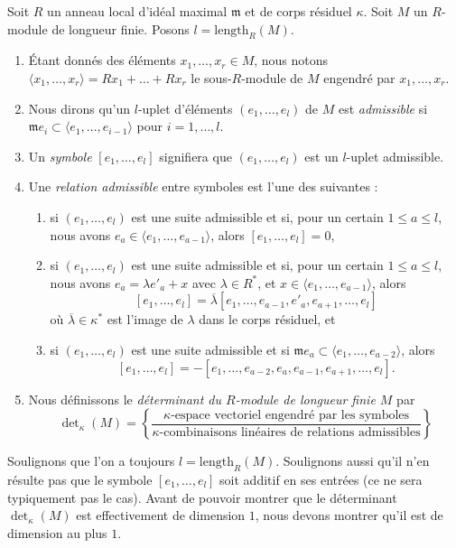 \begin{definition}
\label{definition-determinant}
Soit $R$ un anneau local d'idéal maximal $\mathfrak m$ et de
corps résiduel $\kappa$. Soit $M$ un $R$-module de longueur finie.
Posons $l = \text{length}_R(M)$.
\begin{enumerate}
\item Étant donnés des éléments $x_1, \ldots, x_r \in M$, nous notons
$\langle x_1, \ldots, x_r \rangle = Rx_1 + \ldots + Rx_r$ le
sous-$R$-module de $M$ engendré par $x_1, \ldots, x_r$.
\item Nous dirons qu'un $l$-uplet d'éléments
$(e_1, \ldots, e_l)$ de $M$ est {\it admissible} si
$\mathfrak m e_i \subset \langle e_1, \ldots, e_{i - 1} \rangle$
pour $i = 1, \ldots, l$.
\item Un {\it symbole} $[e_1, \ldots, e_l]$ signifiera que
$(e_1, \ldots, e_l)$ est un $l$-uplet admissible.
\item Une {\it relation admissible} entre symboles est l'une des suivantes :
\begin{enumerate}
\item si $(e_1, \ldots, e_l)$ est une suite admissible et si,
pour un certain $1 \leq a \leq l$, nous avons
$e_a \in \langle e_1, \ldots, e_{a - 1}\rangle$, alors
$[e_1, \ldots, e_l] = 0$,
\item si $(e_1, \ldots, e_l)$ est une suite admissible et si,
pour un certain $1 \leq a \leq l$, nous avons $e_a = \lambda e'_a + x$
avec $\lambda \in R^*$, et
$x \in \langle e_1, \ldots, e_{a - 1}\rangle$, alors
$$
[e_1, \ldots, e_l] =
\overline{\lambda} [e_1, \ldots, e_{a - 1}, e'_a, e_{a + 1}, \ldots, e_l]
$$
où $\overline{\lambda} \in \kappa^*$ est l'image de $\lambda$ dans
le corps résiduel, et
\item si $(e_1, \ldots, e_l)$ est une suite admissible et si
$\mathfrak m e_a \subset \langle e_1, \ldots, e_{a - 2}\rangle$, alors
$$
[e_1, \ldots, e_l] =
- [e_1, \ldots, e_{a - 2}, e_a, e_{a - 1}, e_{a + 1}, \ldots, e_l].
$$
\end{enumerate}
\item
Nous définissons le {\it déterminant du $R$-module de longueur finie $M$} par
$$
\det\nolimits_\kappa(M) =
\left\{
\frac{\kappa\text{-espace vectoriel engendré par les symboles}}
{\kappa\text{-combinaisons linéaires de relations admissibles}}
\right\}
$$
\end{enumerate}
\end{definition}

\noindent
Soulignons que l'on a toujours $l = \text{length}_R(M)$. Soulignons aussi qu'il
n'en résulte pas que le symbole $[e_1, \ldots, e_l]$ soit
additif en ses entrées (ce ne sera typiquement pas le cas).
Avant de pouvoir montrer que le déterminant $\det_\kappa(M)$ est effectivement
de dimension $1$, nous devons montrer qu'il est de dimension au plus $1$.

